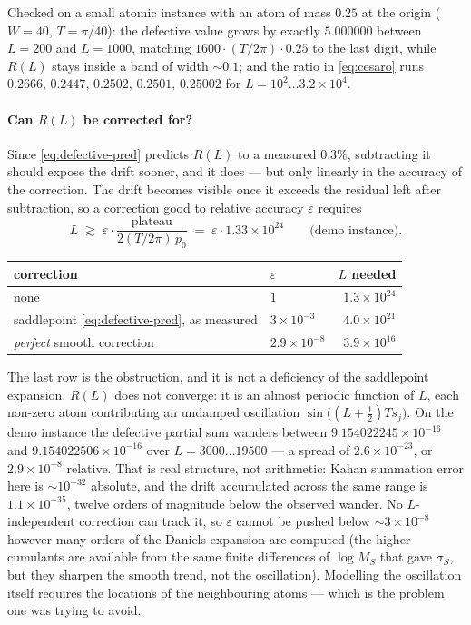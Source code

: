 \documentclass[11pt]{article}
\newcommand{\eps}{\varepsilon}
\begin{document}
Checked on a small atomic instance with an atom of mass $0.25$ at the origin ($W=40$,
$T=\pi/40$): the defective value grows by exactly $5.000000$ between $L=200$ and $L=1000$, matching
$1600\cdot(T/2\pi)\cdot0.25$ to the last digit, while $R(L)$ stays inside a band of width
${\sim}0.1$; and the ratio in \eqref{eq:cesaro} runs $0.2666,\,0.2447,\,0.2502,\,0.2501,\,0.25002$ for
$L=10^2\ldots3.2\times10^4$.

\paragraph{Can $R(L)$ be corrected for?} Since \eqref{eq:defective-pred} predicts $R(L)$ to a
measured $0.3\%$, subtracting it should expose the drift sooner, and it does --- but only linearly in
the accuracy of the correction. The drift becomes visible once it exceeds the residual left after
subtraction, so a correction good to relative accuracy $\eps$ requires
\[
  L\;\gtrsim\;\eps\cdot\frac{\text{plateau}}{2(T/2\pi)\,p_0}\;=\;\eps\cdot1.33\times10^{24}
  \qquad\text{(demo instance).}
\]
\begin{center}
\begin{tabular}{@{}llr@{}}
\toprule
correction & $\eps$ & $L$ needed \\
\midrule
none & $1$ & $1.3\times10^{24}$ \\
saddlepoint \eqref{eq:defective-pred}, as measured & $3\times10^{-3}$ & $4.0\times10^{21}$ \\
\emph{perfect} smooth correction & $2.9\times10^{-8}$ & $3.9\times10^{16}$ \\
\bottomrule
\end{tabular}
\end{center}
The last row is the obstruction, and it is not a deficiency of the saddlepoint expansion. $R(L)$ does
not converge: it is an almost periodic function of $L$, each non-zero atom contributing an
undamped oscillation $\sin\!\big((L+\frac12)Ts_j\big)$. On the demo instance the defective partial
sum wanders between $9.154022245\times10^{-16}$ and $9.154022506\times10^{-16}$ over
$L=3000\ldots19500$ --- a spread of $2.6\times10^{-23}$, or $2.9\times10^{-8}$ relative. That is real
structure, not arithmetic: Kahan summation error here is ${\sim}10^{-32}$ absolute, and the drift
accumulated across the same range is $1.1\times10^{-35}$, twelve orders of magnitude below the
observed wander. No $L$-independent correction can track it, so $\eps$ cannot be pushed below
${\sim}3\times10^{-8}$ however many orders of the Daniels expansion are computed (the higher
cumulants are available from the same finite differences of $\log M_S$ that gave $\sigma_S$, but they
sharpen the smooth trend, not the oscillation). Modelling the oscillation itself requires the
locations of the neighbouring atoms --- which is the problem one was trying to avoid.
\end{document}
